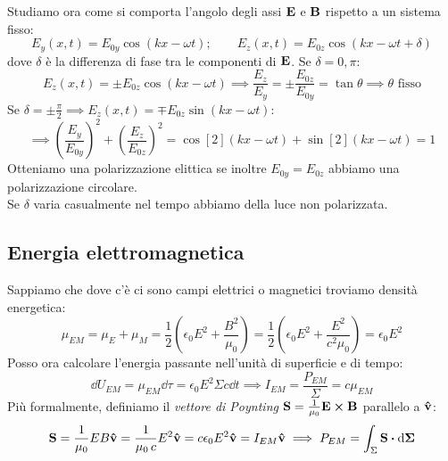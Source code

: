 \documentclass[12pt,a4paper]{article}
\begin{document}
Studiamo ora come si comporta l'angolo degli assi $\vb{E}$ e $\vb{B}$ rispetto a un sistema fisso:
\begin{equation*}
    E_y (x,t)= E_{0y}\cos(kx-\omega t); \qquad E_z(x,t) = E_{0z}\cos(kx-\omega t +\delta)
\end{equation*}
dove $\delta$ è la differenza di fase tra le componenti di $\vb{E}$. Se $\delta= 0,\pi$:
\begin{equation*}
    E_z (x,t)= \pm E_{0z}\cos(kx-\omega t)\implies\frac{E_z}{E_y}=\pm \frac{E_{0z}}{E_{0y}}=\tan \theta \implies \theta\text{ fisso} 
\end{equation*}
Se $\delta= \pm \frac{\pi}{2}\implies E_z (x,t)= \mp E_{0z}\sin(kx-\omega t) $:
\begin{equation*}
     \implies\left( \frac{E_y}{E_{0y}} \right)^2+\left( \frac{E_z}{E_{0z}} \right)^2= 
     \cos[2](kx-\omega t)+ \sin[2](kx-\omega t)= 1
\end{equation*}
Otteniamo una polarizzazione elittica se inoltre $E_{0y}=E_{0z}$ abbiamo una polarizzazione circolare.
\\Se $\delta$ varia casualmente nel tempo abbiamo della luce non polarizzata.
\subsection{Energia elettromagnetica}
Sappiamo che dove c'è ci sono campi elettrici o magnetici troviamo densità energetica:
\begin{equation*}
    \mu_{EM}= \mu_E + \mu_M = \frac{1}{2}\left( \epsilon_0E^2+ \frac{B^2}{\mu_0} \right)=
     \frac{1}{2}\left( \epsilon_0 E^2 + \frac{E^2}{c^2\mu_0} \right)= \epsilon_0E^2
\end{equation*}
Posso ora calcolare l'energia passante nell'unità di superficie e di tempo:
\begin{equation*}
    \dd{U}_{EM}= \mu_{EM}\dd{\tau}= \epsilon_0 E^2\Sigma c \dd{t}\implies I_{EM}= \frac{P_{EM}}{\Sigma}= c\mu_{EM}
\end{equation*}
Più formalmente, definiamo il \textit{vettore di Poynting} $\vb{S}= \frac{1}{\mu_0}\vb{E}\cp\vb{B}$ parallelo a $\vu{v}$:
\begin{equation*}
    \vb{S}= \frac{1}{\mu_0}EB\vu{v}= \frac{1}{\mu_0 \,c}E^2\vu{v}= c \epsilon_0 E^2 \vu{v}= I_{EM}\vu{v}
    \implies P_{EM } = \int_{\Sigma} \vb{S}\vdot\dd{\vb{\Sigma}}
\end{equation*}
\end{document}
